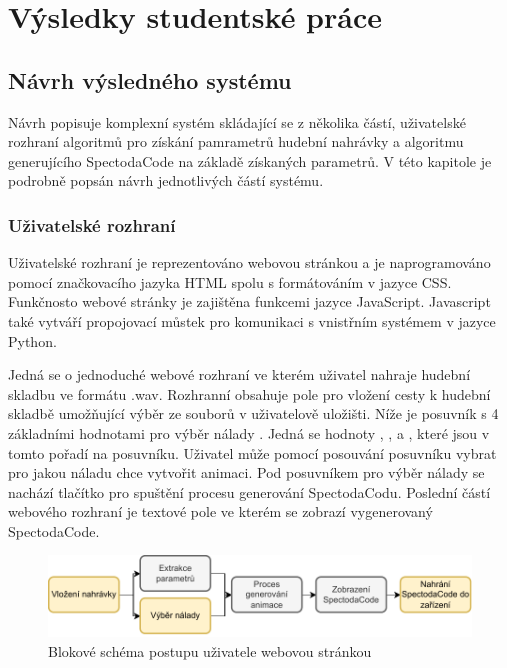 \chapter{Výsledky studentské práce}


\section{Návrh výsledného systému}

Návrh popisuje komplexní systém skládající se z několika částí, uživatelské rozhraní algoritmů pro získání pamrametrů hudební nahrávky a algoritmu generujícího SpectodaCode na základě získaných parametrů. V této kapitole je podrobně popsán návrh jednotlivých částí systému. 

\subsection{Uživatelské rozhraní}

Uživatelské rozhraní je reprezentováno webovou stránkou a je naprogramováno pomocí značkovacího jazyka \acs{HTML} spolu s formátováním v jazyce CSS. Funkčnosto webové stránky je zajištěna funkcemi jazyce JavaScript. Javascript také vytváří propojovací můstek pro komunikaci s vnistřním systémem v jazyce Python.

Jedná se o jednoduché webové rozhraní ve kterém uživatel nahraje hudební skladbu ve formátu .wav. Rozhranní obsahuje pole pro vložení cesty k hudební skladbě umožňující výběr ze souborů v uživatelově uložišti. Níže je posuvník s 4 základními hodnotami pro výběr nálady
. Jedná se hodnoty , ,  a , které jsou v tomto pořadí na posuvníku. Uživatel může pomocí posouvání posuvníku vybrat pro jakou náladu chce vytvořit animaci. Pod posuvníkem pro výběr nálady se nachází tlačítko pro spuštění procesu generování SpectodaCodu.
Poslední částí webového rozhraní je textové pole ve kterém se zobrazí vygenerovaný SpectodaCode.

 \begin{figure}[H]
    \centering
    \includegraphics[width = 1\linewidth]{obrazky/User_interaction_diagram.pdf}
    \caption{Blokové schéma postupu uživatele webovou stránkou}
    \label{fig:User_interaction_diagram}
\end{figure}

